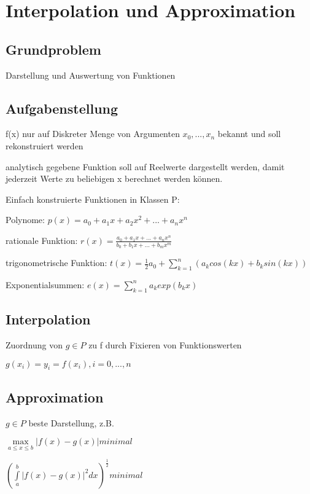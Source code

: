 \documentclass[12pt,a4paper]{article} %
\begin{document}
	\newpage
	
	\section{Interpolation und Approximation}
	
	\subsection{Grundproblem}
	
	Darstellung und Auswertung von Funktionen
	
	\subsection{Aufgabenstellung}
	
	f(x) nur auf Diskreter Menge von Argumenten $x_0, ..., x_n$ bekannt und soll rekonstruiert werden
	
	analytisch gegebene Funktion soll auf Reelwerte dargestellt werden, damit jederzeit Werte zu beliebigen x berechnet werden können.
	
	Einfach konstruierte Funktionen in Klassen P:
	
	Polynome: $p(x) = a_0 + a_1x + a_2x^2 + ... + a_nx^n$
	
	rationale Funktion: $r(x) = \frac{a_0 + a_1x + ... + a_nx^n}{b_0 + b_1x + ... + b_mx^m}$
	
	trigonometrische Funktion: $t(x) = \frac{1}{2}a_0 + \sum\limits_{k = 1}^{n}(a_kcos(kx) + b_ksin(kx))$
	
	Exponentialsummen: $e(x) = \sum\limits_{k = 1}^{n}a_kexp(b_kx)$
	
	\subsection{Interpolation}
	
	Zuordnung von $g \in P$ zu f durch Fixieren von Funktionswerten
	
	$g(x_i) = y_i = f(x_i), i = 0, ..., n$
	
	\subsection{Approximation}
	
	$g \in P$ beste Darstellung, z.B. 
	
	$\max\limits_{a \le x \le b}|f(x) - g(x)| minimal$
	
	$(\int\limits_{a}^{b}|f(x) - g(x)|^2dx)^{\frac{1}{2}} minimal$
	
\end{document}
